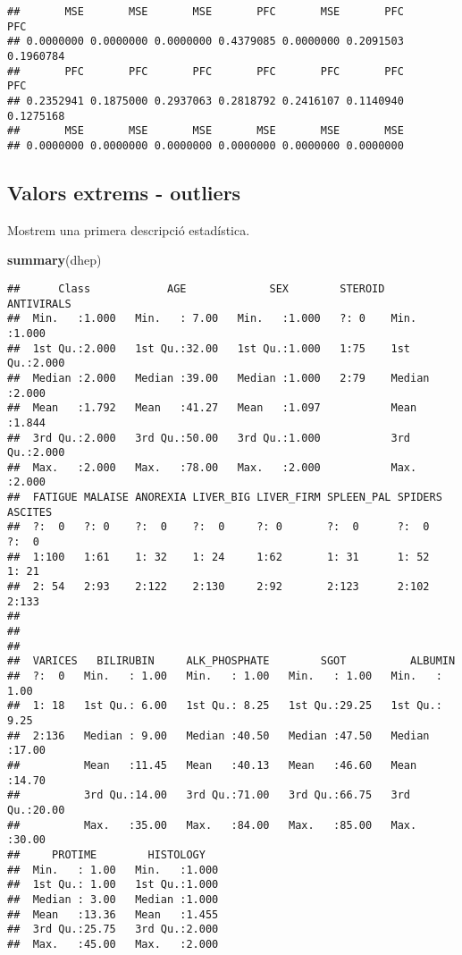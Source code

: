 \documentclass[]{article}
\newenvironment{Shaded}{\begin{snugshade}}{\end{snugshade}}
\newcommand{\KeywordTok}[1]{\textcolor[rgb]{0.13,0.29,0.53}{\textbf{#1}}}
\newcommand{\NormalTok}[1]{#1}
\begin{document}
\begin{verbatim}
##       MSE       MSE       MSE       PFC       MSE       PFC       PFC 
## 0.0000000 0.0000000 0.0000000 0.4379085 0.0000000 0.2091503 0.1960784 
##       PFC       PFC       PFC       PFC       PFC       PFC       PFC 
## 0.2352941 0.1875000 0.2937063 0.2818792 0.2416107 0.1140940 0.1275168 
##       MSE       MSE       MSE       MSE       MSE       MSE 
## 0.0000000 0.0000000 0.0000000 0.0000000 0.0000000 0.0000000
\end{verbatim}

\hypertarget{valors-extrems---outliers}{%
\subsection{Valors extrems - outliers}\label{valors-extrems---outliers}}

Mostrem una primera descripció estadística.

\begin{Shaded}
\begin{Highlighting}[]
\KeywordTok{summary}\NormalTok{(dhep)}
\end{Highlighting}
\end{Shaded}

\begin{verbatim}
##      Class            AGE             SEX        STEROID   ANTIVIRALS   
##  Min.   :1.000   Min.   : 7.00   Min.   :1.000   ?: 0    Min.   :1.000  
##  1st Qu.:2.000   1st Qu.:32.00   1st Qu.:1.000   1:75    1st Qu.:2.000  
##  Median :2.000   Median :39.00   Median :1.000   2:79    Median :2.000  
##  Mean   :1.792   Mean   :41.27   Mean   :1.097           Mean   :1.844  
##  3rd Qu.:2.000   3rd Qu.:50.00   3rd Qu.:1.000           3rd Qu.:2.000  
##  Max.   :2.000   Max.   :78.00   Max.   :2.000           Max.   :2.000  
##  FATIGUE MALAISE ANOREXIA LIVER_BIG LIVER_FIRM SPLEEN_PAL SPIDERS ASCITES
##  ?:  0   ?: 0    ?:  0    ?:  0     ?: 0       ?:  0      ?:  0   ?:  0  
##  1:100   1:61    1: 32    1: 24     1:62       1: 31      1: 52   1: 21  
##  2: 54   2:93    2:122    2:130     2:92       2:123      2:102   2:133  
##                                                                          
##                                                                          
##                                                                          
##  VARICES   BILIRUBIN     ALK_PHOSPHATE        SGOT          ALBUMIN     
##  ?:  0   Min.   : 1.00   Min.   : 1.00   Min.   : 1.00   Min.   : 1.00  
##  1: 18   1st Qu.: 6.00   1st Qu.: 8.25   1st Qu.:29.25   1st Qu.: 9.25  
##  2:136   Median : 9.00   Median :40.50   Median :47.50   Median :17.00  
##          Mean   :11.45   Mean   :40.13   Mean   :46.60   Mean   :14.70  
##          3rd Qu.:14.00   3rd Qu.:71.00   3rd Qu.:66.75   3rd Qu.:20.00  
##          Max.   :35.00   Max.   :84.00   Max.   :85.00   Max.   :30.00  
##     PROTIME        HISTOLOGY    
##  Min.   : 1.00   Min.   :1.000  
##  1st Qu.: 1.00   1st Qu.:1.000  
##  Median : 3.00   Median :1.000  
##  Mean   :13.36   Mean   :1.455  
##  3rd Qu.:25.75   3rd Qu.:2.000  
##  Max.   :45.00   Max.   :2.000
\end{verbatim}
\end{document}
